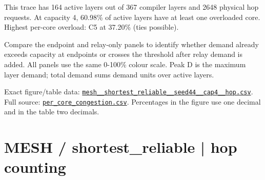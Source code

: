 \documentclass[10pt,a4paper]{article}
\begin{document}
This trace has 164 active layers out of 367 compiler layers and 2648 physical hop requests. At capacity 4, 60.98\% of active layers have at least one overloaded core. Highest per-core overload: C5 at 37.20\% (ties possible).\par
Compare the endpoint and relay-only panels to identify whether demand already exceeds capacity at endpoints or crosses the threshold after relay demand is added. All panels use the same 0-100\% colour scale. Peak D is the maximum layer demand; total demand sums demand units over active layers.\par
Exact figure/table data: \href{\detokenize{file:///home/dhruv-pansuriya/Documents/BTP/Compiler-Driven-ACE/output/pdf/qaoa_methods_congestion/tables/mesh__shortest_reliable__seed44__cap4__hop.csv}}{\nolinkurl{mesh__shortest_reliable__seed44__cap4__hop.csv}}. Full source: \href{\detokenize{file:///home/dhruv-pansuriya/Documents/BTP/Compiler-Driven-ACE/results/qaoa_2seed_2026-10-26/congestion/per_core_congestion.csv}}{\nolinkurl{per_core_congestion.csv}}. Percentages in the figure use one decimal and in the table two decimals.\par
\clearpage
\section*{MESH / shortest\_reliable | hop counting}
\end{document}
